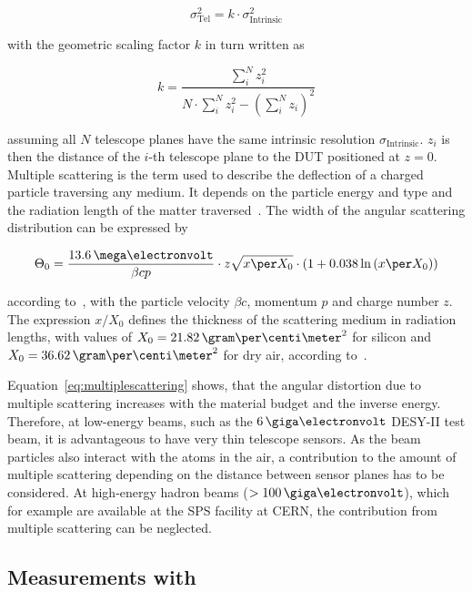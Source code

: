 \begin{equation}
\label{eq:telescopepointing}
\sigma_{\textrm{Tel}}^2 = k \cdot \sigma_{\textrm{Intrinsic}}^2
\end{equation}

\noindent with the geometric scaling factor $k$ in turn written as

\begin{equation}
k = \frac{\sum_i^N z_i^2}{N \cdot \sum_i^N z_i^2 - \left( \sum_i^N z_i
\right)^2}
\end{equation}

\noindent assuming all $N$ telescope planes have the same intrinsic resolution $\sigma_{\textrm{Intrinsic}}$. 
$z_i$ is then the distance of the $i$-th telescope plane to the DUT positioned at $z=0$.
Multiple scattering is the term used to describe the deflection of a charged particle traversing any medium.
It depends on the particle energy and type and the radiation length of the matter traversed~\cite{ref:scatteringhighland}.
The width of the angular scattering distribution can be expressed by

\begin{equation}
\label{eq:multiplescattering}
\Theta_{0} = \frac{13.6\,\mega\electronvolt}{\beta c p} \cdot z
\sqrt{x \per X_0}
\cdot \left( 1 + 0.038 \ln{\left( x \per X_0\right) } \right)
\end{equation}

according to~\cite{ref:PDG-2014}, with the particle velocity $\beta c$, momentum $p$ and charge number $z$. 
The expression $x/X_0$ defines the thickness of the scattering medium in radiation lengths,
 with values of $X_0 = 21.82\,\allowbreak\gram\per\centi\meter^2$ for silicon and $X_0 = 36.62\,\gram\per\centi\meter^2$ for dry air, according to~\cite{ref:x0values}.

Equation~\ref{eq:multiplescattering} shows, that the angular distortion due to multiple scattering increases with the material budget and the inverse energy.
Therefore, at low-energy beams, such as the $6\,\giga\electronvolt$ DESY-II test beam, it is advantageous to have very thin telescope sensors. 
As the beam particles also interact with the atoms in the air, a contribution to the amount of multiple scattering depending on the distance between sensor planes has to be considered. 
At high-energy hadron beams ($> 100\,\giga\electronvolt$), which for example are available at the SPS facility at CERN, the contribution from multiple scattering can be neglected.

\subsection{Measurements with \Datura}

